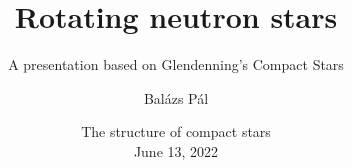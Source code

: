 \title[Rotating neutron stars]
{Rotating neutron stars}
\subtitle{A presentation based on Glendenning's Compact Stars}

\author[Balázs Pál]
{Balázs Pál}


\date[ELTE 2022]
{The structure of compact stars\\June 13, 2022}


